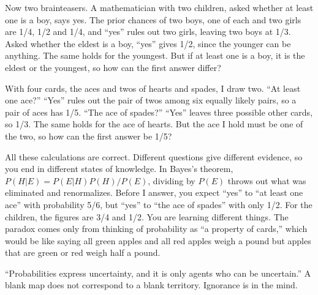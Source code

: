 Now two brainteasers. A mathematician with two children, asked whether at least one is a boy, says yes. The prior chances of two boys, one of each and two girls are 1/4, 1/2 and 1/4, and ``yes'' rules out two girls, leaving two boys at 1/3. Asked whether the eldest is a boy, ``yes'' gives 1/2, since the younger can be anything. The same holds for the youngest. But if at least one is a boy, it is the eldest or the youngest, so how can the first answer differ?

With four cards, the aces and twos of hearts and spades, I draw two. ``At least one ace?'' ``Yes'' rules out the pair of twos among six equally likely pairs, so a pair of aces has 1/5. ``The ace of spades?'' ``Yes'' leaves three possible other cards, so 1/3. The same holds for the ace of hearts. But the ace I hold must be one of the two, so how can the first answer be 1/5?

All these calculations are correct. Different questions give different evidence, so you end in different states of knowledge. In Bayes's theorem, $P(H|E) = P(E|H)P(H)/P(E)$, dividing by $P(E)$ throws out what was eliminated and renormalizes. Before I answer, you expect ``yes'' to ``at least one ace'' with probability 5/6, but ``yes'' to ``the ace of spades'' with only 1/2. For the children, the figures are 3/4 and 1/2. You are learning different things. The paradox comes only from thinking of probability as ``a property of cards,'' which would be like saying all green apples and all red apples weigh a pound but apples that are green or red weigh half a pound. 

``Probabilities express uncertainty, and it is only agents who can be uncertain.'' A blank map does not correspond to a blank territory. Ignorance is in the mind. 
